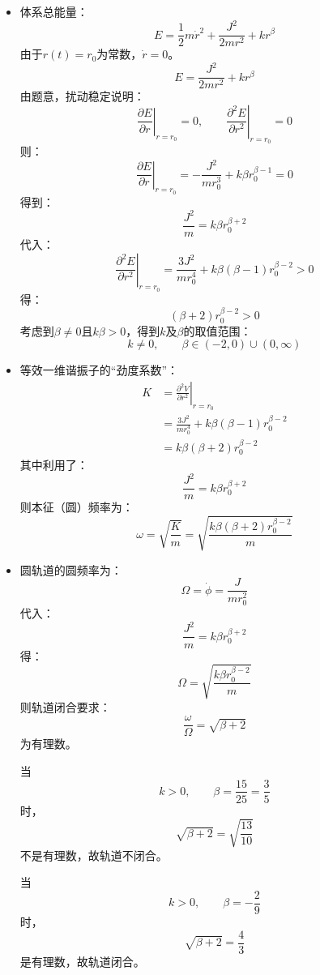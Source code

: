 \documentclass[a4paper,fontset=windows]{ctexart}
\begin{document}
\begin{itemize}
        \item[5.(b)]
        体系总能量：
        \[
        E = \frac{1}{2}m\dot{r}^2 + \frac{J^2}{2mr^2} + kr^\beta
        \]
        由于$r(t)=r_0$为常数，$\dot{r} = 0$。
        \[
        E = \frac{J^2}{2mr^2} + kr^\beta
        \]
        由题意，扰动稳定说明：
        \[
        \left.\frac{\partial E}{\partial r}\right|_{r=r_0} = 0,\qquad \left.\frac{\partial^2 E}{\partial r^2}\right|_{r=r_0} = 0
        \]
        则：
        \[
        \left.\frac{\partial E}{\partial r}\right|_{r=r_0} = -\frac{J^2}{mr_0^3} + k\beta r_0^{\beta-1} = 0
        \]
        得到：
        \[
        \frac{J^2}{m} = k\beta r_0^{\beta+2}
        \]
        代入：
        \[
        \left.\frac{\partial^2 E}{\partial r^2}\right|_{r=r_0} = \frac{3J^2}{mr_0^4} + k\beta(\beta-1)r_0^{\beta-2} > 0
        \]
        得：
        \[
        (\beta+2)r_0^{\beta-2} > 0
        \]
        考虑到$\beta \neq 0$且$k\beta > 0$，得到$k$及$\beta$的取值范围：
        \[
        k \neq 0,\qquad \beta \in (-2,0)\cup(0,\infty)
        \]
        \medskip

        \item[5.(c)]
        等效一维谐振子的“劲度系数”：
        \begin{align*}
        K
        &= \left.\frac{\partial^2 V}{\partial r^2}\right|_{r=r_0} \\
        &= \frac{3J^2}{mr_0^4} + k\beta(\beta-1)r_0^{\beta-2} \\
        &= k\beta(\beta+2)r_0^{\beta-2}
        \end{align*}
        其中利用了：
        \[
        \frac{J^2}{m} = k\beta r_0^{\beta+2}
        \]
        则本征（圆）频率为：
        \[
        \omega = \sqrt{\frac{K}{m}} = \sqrt{\frac{k\beta(\beta+2)r_0^{\beta-2}}{m}}
        \]
        \medskip

        \item[5.(d)]
        圆轨道的圆频率为：
        \[
        \varOmega = \dot{\phi} = \frac{J}{mr_0^2}
        \]
        代入：
        \[
        \frac{J^2}{m} = k\beta r_0^{\beta+2}
        \]
        得：
        \[
        \varOmega = \sqrt{\frac{k\beta r_0^{\beta-2}}{m}}
        \]
        则轨道闭合要求：
        \[
        \frac{\omega}{\varOmega} = \sqrt{\beta+2}
        \]
        为有理数。

        当
        \[
        k>0,\qquad \beta = \frac{15}{25} = \frac{3}{5}
        \]
        时，
        \[
        \sqrt{\beta+2} = \sqrt{\frac{13}{10}}
        \]
        不是有理数，故轨道不闭合。

        当
        \[
        k>0,\qquad \beta = -\frac{2}{9}
        \]
        时，
        \[
        \sqrt{\beta+2} = \frac{4}{3}
        \]
        是有理数，故轨道闭合。

    \end{itemize}
\end{document}
